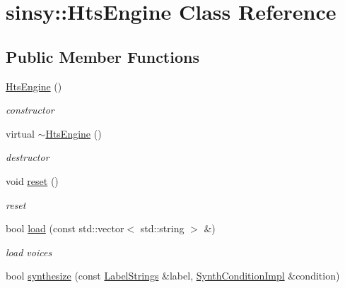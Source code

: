 \hypertarget{classsinsy_1_1HtsEngine}{\section{sinsy\-:\-:\-Hts\-Engine \-Class \-Reference}
\label{classsinsy_1_1HtsEngine}
}
\subsection*{\-Public \-Member \-Functions}
\begin{DoxyCompactItemize}
\item 
\hypertarget{classsinsy_1_1HtsEngine_abc60230d1bb17390cac5208ad92a7f1f}{\hyperlink{classsinsy_1_1HtsEngine_abc60230d1bb17390cac5208ad92a7f1f}{\-Hts\-Engine} ()}\label{classsinsy_1_1HtsEngine_abc60230d1bb17390cac5208ad92a7f1f}

\begin{DoxyCompactList}\small\item\em constructor \end{DoxyCompactList}\item 
\hypertarget{classsinsy_1_1HtsEngine_a9d9afbaddb75474cf4ffe33654579295}{virtual \hyperlink{classsinsy_1_1HtsEngine_a9d9afbaddb75474cf4ffe33654579295}{$\sim$\-Hts\-Engine} ()}\label{classsinsy_1_1HtsEngine_a9d9afbaddb75474cf4ffe33654579295}

\begin{DoxyCompactList}\small\item\em destructor \end{DoxyCompactList}\item 
\hypertarget{classsinsy_1_1HtsEngine_a337a3979d17c2fcd2414a41b02945fac}{void \hyperlink{classsinsy_1_1HtsEngine_a337a3979d17c2fcd2414a41b02945fac}{reset} ()}\label{classsinsy_1_1HtsEngine_a337a3979d17c2fcd2414a41b02945fac}

\begin{DoxyCompactList}\small\item\em reset \end{DoxyCompactList}\item 
\hypertarget{classsinsy_1_1HtsEngine_a05a749ae2088408c428f7a06c52bc353}{bool \hyperlink{classsinsy_1_1HtsEngine_a05a749ae2088408c428f7a06c52bc353}{load} (const std\-::vector$<$ std\-::string $>$ \&)}\label{classsinsy_1_1HtsEngine_a05a749ae2088408c428f7a06c52bc353}

\begin{DoxyCompactList}\small\item\em load voices \end{DoxyCompactList}\item 
\hypertarget{classsinsy_1_1HtsEngine_acb65581494d993aaa5009a766b3be8b5}{bool \hyperlink{classsinsy_1_1HtsEngine_acb65581494d993aaa5009a766b3be8b5}{synthesize} (const \hyperlink{classsinsy_1_1LabelStrings}{\-Label\-Strings} \&label, \hyperlink{classsinsy_1_1SynthConditionImpl}{\-Synth\-Condition\-Impl} \&condition)}\label{classsinsy_1_1HtsEngine_acb65581494d993aaa5009a766b3be8b5}


\end{DoxyCompactItemize}
